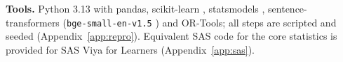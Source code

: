 \textbf{Tools.} Python 3.13 with pandas, scikit-learn \citep{pedregosa2011}, statsmodels
\citep{seabold2010}, sentence-transformers \citep{reimers2019} (\texttt{bge-small-en-v1.5}
\citep{xiao2023bge}) and OR-Tools; all steps are scripted and seeded
(Appendix~\ref{app:repro}). Equivalent SAS code for the core statistics is provided for SAS Viya
for Learners \citep{sasvfl} (Appendix~\ref{app:sas}).
